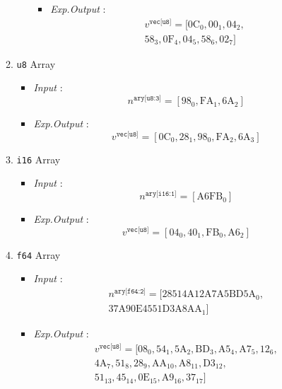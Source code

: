\documentclass[../alan-handbook.tex]{subfiles}
\begin{document}
\begin{enumerate}
\begin{enumerate}
\begin{enumerate}
\begin{itemize}
                        \item \textit{Exp.Output} : $$\begin{matrix}v^{\texttt{vec[u8]}} = [\text{0C}_0,\text{00}_1,\text{04}_2, \\ \text{58}_3, \text{0F}_4,\text{04}_5,\text{58}_6,\text{02}_7]\end{matrix}$$
                    \end{itemize}
            \end{enumerate}
            \item \texttt{u8} Array
                \begin{itemize}
                    \item \textit{Input} : $$n^{\texttt{ary[u8:3]}} = [\text{98}_0,\text{FA}_1,\text{6A}_2]$$
                    \item \textit{Exp.Output} : $$v^{\texttt{vec[u8]}} = [\text{0C}_0,\text{28}_1,\text{98}_0,\text{FA}_2,\text{6A}_3]$$
                \end{itemize}
            \item \texttt{i16} Array
                \begin{itemize}
                    \item \textit{Input} : $$n^{\texttt{ary[i16:1]}} = [\text{A6FB}_0]$$
                    \item \textit{Exp.Output} : $$v^{\texttt{vec[u8]}} = [\text{04}_0,\text{40}_1,\text{FB}_0,\text{A6}_2]$$
                \end{itemize}
            \item \texttt{f64} Array
                \begin{itemize}
                    \item \textit{Input} : $$\begin{matrix}n^{\texttt{ary[f64:2]}} = [\text{28514A12A7A5BD5A}_0, \\ \text{37A90E4551D3A8AA}_1]\end{matrix}$$
                    \item \textit{Exp.Output} : $$\begin{matrix}v^{\texttt{vec[u8]}} = [\text{08}_0,\text{54}_1,\text{5A}_2,\text{BD}_3,\text{A5}_4,\text{A7}_5,\text{12}_6,\\\text{4A}_7,\text{51}_8,\text{28}_9,\text{AA}_{10},\text{A8}_{11},\text{D3}_{12},\\\text{51}_{13},\text{45}_{14},\text{0E}_{15},\text{A9}_{16},\text{37}_{17}]\end{matrix}$$
                \end{itemize}

\end{enumerate}
\end{enumerate}
\end{document}
